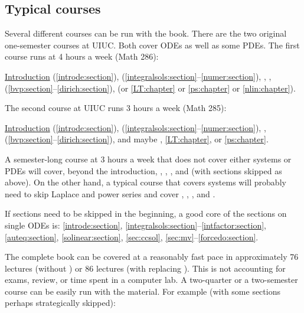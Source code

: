 \subsection{Typical courses}

Several different courses can be run with the book.
There are the two original one-semester
courses at UIUC\@.
Both cover ODEs as well as some PDEs.
The first course runs at 4 hours a week (Math 286):

\medskip

\noindent
\hyperref[intro:chapter]{Introduction} (\ref{introde:section}),
 (\ref{integralsols:section}--\ref{numer:section}),
,
,
 (\ref{bvp:section}--\ref{dirich:section}),
 (or
\ref{LT:chapter} or \ref{ps:chapter} or \ref{nlin:chapter}).

\medskip

The second course at UIUC runs 3 hours a week (Math 285):

\medskip

\noindent
\hyperref[intro:chapter]{Introduction} (\ref{introde:section}),
 (\ref{integralsols:section}--\ref{numer:section}),
,
 (\ref{bvp:section}--\ref{dirich:section}),
and maybe ,
\ref{LT:chapter}, or \ref{ps:chapter}.

\medskip

A semester-long course at 3 hours a week that does not cover either systems
or PDEs
will cover, beyond the introduction,
,
,
, and 
(with sections skipped as above).
On the other hand, a typical course that covers
systems will probably need to skip Laplace and power series
and cover
,
,
, and .

\medskip

If sections need to be skipped in the beginning, a good core of the
sections on single ODEs is:
\ref{introde:section},
\ref{integralsols:section}--\ref{intfactor:section},
\ref{auteq:section},
\ref{solinear:section},
\ref{sec:ccsol},
\ref{sec:mv}--\ref{forcedo:section}.

\medskip

The complete book can be covered at a reasonably
fast pace in approximately 76 lectures
(without )
or 86 lectures (with  replacing
).
This is not accounting for exams, review,
or time spent in a computer lab. %
A two-quarter or a two-semester course can be easily run with the material.
For example (with some sections perhaps strategically skipped):

